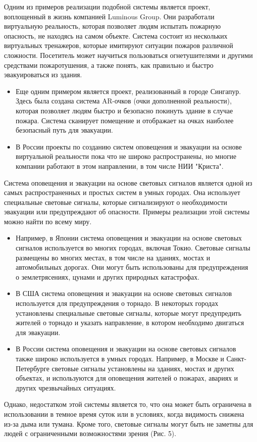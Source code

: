 \begin{multicols}{2}
Одним из примеров реализации подобной системы является проект,
воплощенный в жизнь компанией Luminous Group. Они разработали
виртуальную реальность, которая позволяет людям испытать пожарную
опасность, не находясь на самом объекте. Система состоит из нескольких
виртуальных тренажеров, которые имитируют ситуации пожаров различной
сложности. Посетитель может научиться пользоваться огнетушителями и
другими средствами пожаротушения, а также понять, как правильно и быстро
эвакуироваться из здания.

\begin{itemize}
\item
  Еще одним примером является проект, реализованный в городе Сингапур.
  Здесь была создана система AR-очков (очки дополненной реальности),
  которая позволяет людям быстро и безопасно покинуть здание в случае
  пожара. Система сканирует помещение и отображает на очках наиболее
  безопасный путь для эвакуации.
\item
  В России проекты по созданию систем оповещения и эвакуации на основе
  виртуальной реальности пока что не широко распространены, но многие
  компании работают в этом направлении, в том числе НИИ "Криста".
\end{itemize}

Система оповещения и эвакуации на основе световых сигналов является
одной из самых распространенных и простых систем в умных городах. Она
использует специальные световые сигналы, которые сигнализируют о
необходимости эвакуации или предупреждают об опасности. Примеры
реализации этой системы можно найти по всему миру.

\begin{itemize}
\item
  Например, в Японии система оповещения и эвакуации на основе световых
  сигналов используется во многих городах, включая Токио. Световые
  сигналы размещены во многих местах, в том числе на зданиях, мостах и
  автомобильных дорогах. Они могут быть использованы для предупреждения
  о землетрясениях, цунами и других природных катастрофах.
\item
  В США система оповещения и эвакуации на основе световых сигналов
  используется для предупреждения о торнадо. В некоторых городах
  установлены специальные световые сигналы, которые могут предупредить
  жителей о торнадо и указать направление, в котором необходимо
  двигаться для эвакуации.
\item
  В России система оповещения и эвакуации на основе световых сигналов
  также широко используется в умных городах. Например, в Москве и
  Санкт-Петербурге световые сигналы установлены на зданиях, мостах и
  других объектах, и используются для оповещения жителей о пожарах,
  авариях и других чрезвычайных ситуациях.
\end{itemize}

Однако, недостатком этой системы является то, что она может быть
ограничена в использовании в темное время суток или в условиях, когда
видимость снижена из-за дыма или тумана. Кроме того, световые сигналы
могут быть не заметны для людей с ограниченными возможностями зрения
(Рис. 5).

\end{multicols}

